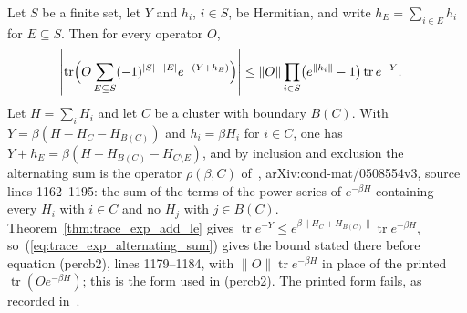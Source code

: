 \begin{theorem}
    \label{thm:trace_exp_alternating_sum}
    \leanok
    Let $S$ be a finite set, let $Y$ and $h_i$, $i\in S$, be Hermitian, and
    write $h_E=\sum_{i\in E}h_i$ for $E\subseteq S$. Then for every operator $O$,
    \begin{align}
        \left|\operatorname{tr}\Bigl(O\sum_{E\subseteq S}(-1)^{|S|-|E|}
        e^{-(Y+h_E)}\Bigr)\right|
         & \le \|O\|\prod_{i\in S}\bigl(e^{\|h_i\|}-1\bigr)
        \operatorname{tr}e^{-Y}.
        \label{eq:trace_exp_alternating_sum}
    \end{align}
    Let $H=\sum_iH_i$ and let $C$ be a cluster with boundary $B(C)$. With
    $Y=\beta(H-H_C-H_{B(C)})$ and $h_i=\beta H_i$ for $i\in C$, one has
    $Y+h_E=\beta(H-H_{B(C)}-H_{C\setminus E})$, and by inclusion and exclusion
    the alternating sum is the operator $\rho(\beta,C)$
    of~\cite{Hastings2006Solving}, arXiv:cond-mat/0508554v3, source lines
    1162--1195: the sum of the terms of the power series of $e^{-\beta H}$
    containing every $H_i$ with $i\in C$ and no $H_j$ with $j\in B(C)$.
    Theorem~\ref{thm:trace_exp_add_le} gives
    $\operatorname{tr}e^{-Y}\le e^{\beta\|H_C+H_{B(C)}\|}\operatorname{tr}e^{-\beta H}$,
    so~(\ref{eq:trace_exp_alternating_sum}) gives the bound stated there
    before equation (percb2), lines 1179--1184, with
    $\|O\|\operatorname{tr}e^{-\beta H}$ in place of the printed
    $\operatorname{tr}(Oe^{-\beta H})$; this is the form used in (percb2).
    The printed form fails, as recorded
    in~\cite{gap:hastings05_cluster_part_trace_pairing}.
\end{theorem}
